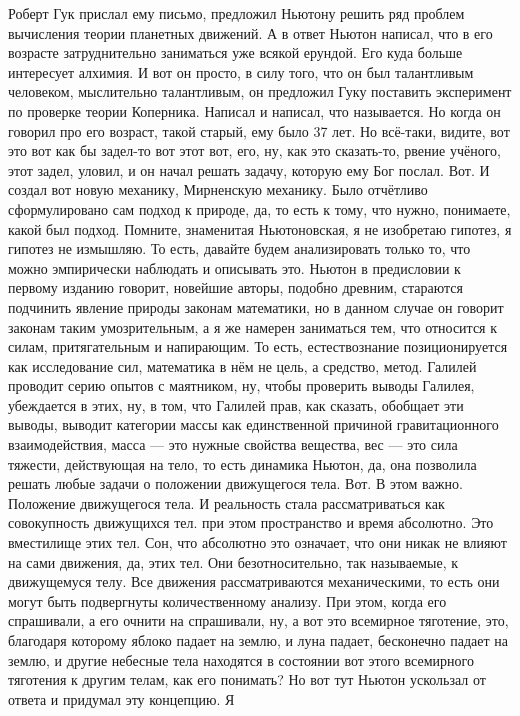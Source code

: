 Роберт Гук прислал ему письмо, предложил Ньютону решить ряд проблем вычисления
теории планетных движений. А в ответ Ньютон написал, что в его возрасте
затруднительно заниматься уже всякой ерундой. Его куда больше интересует
алхимия. И вот он просто, в силу того, что он был талантливым человеком,
мыслительно талантливым, он предложил Гуку поставить эксперимент по проверке
теории Коперника. Написал и написал, что называется. Но когда он говорил про его
возраст, такой старый, ему было 37 лет. Но всё-таки, видите, вот это вот как бы
задел-то вот этот вот, его, ну, как это сказать-то, рвение учёного, этот задел,
уловил, и он начал решать задачу, которую ему Бог послал. Вот. И создал вот
новую механику, Мирненскую механику. Было отчётливо сформулировано сам подход к
природе, да, то есть к тому, что нужно, понимаете, какой был подход. Помните,
знаменитая Ньютоновская, я не изобретаю гипотез, я гипотез не измышляю. То есть,
давайте будем анализировать только то, что можно эмпирически наблюдать и
описывать это. Ньютон в предисловии к первому изданию говорит, новейшие авторы,
подобно древним, стараются подчинить явление природы законам математики, но в
данном случае он говорит законам таким умозрительным, а я же намерен заниматься
тем, что относится к силам, притягательным и напирающим. То есть, естествознание
позиционируется как исследование сил, математика в нём не цель, а средство,
метод. Галилей проводит серию опытов с маятником, ну, чтобы проверить выводы
Галилея, убеждается в этих, ну, в том, что Галилей прав, как сказать, обобщает
эти выводы, выводит категории массы как единственной причиной гравитационного
взаимодействия, масса — это нужные свойства вещества, вес — это сила тяжести,
действующая на тело, то есть динамика Ньютон, да, она позволила решать любые
задачи о положении движущегося тела. Вот. В этом важно. Положение движущегося
тела. И реальность стала рассматриваться как совокупность движущихся тел. при
этом пространство и время абсолютно. Это вместилище этих тел. Сон, что абсолютно
это означает, что они никак не влияют на сами движения, да, этих тел. Они
безотносительно, так называемые, к движущемуся телу. Все движения
рассматриваются механическими, то есть они могут быть подвергнуты
количественному анализу. При этом, когда его спрашивали, а его очнити на
спрашивали, ну, а вот это всемирное тяготение, это, благодаря которому яблоко
падает на землю, и луна падает, бесконечно падает на землю, и другие небесные
тела находятся в состоянии вот этого всемирного тяготения к другим телам, как
его понимать? Но вот тут Ньютон ускользал от ответа и придумал эту концепцию. Я
